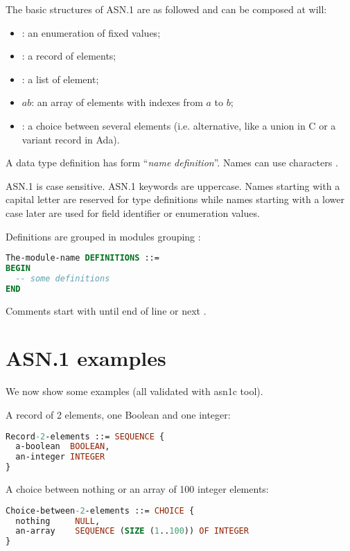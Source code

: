 The basic structures of ASN.1 are as followed and can be composed at
will:
\begin{itemize}
\item {}: an
  enumeration of fixed values;
\item {}: a record of
  elements;
\item {}: a list
  of element;
\item {}$a$$b$: an array of elements with indexes
  from $a$ to $b$;
\item {}: a choice between
  several elements (i.e. alternative, like a union in C or a variant
  record in Ada).
\end{itemize}

A data type definition has form ``\emph{name} \ASN{::=}
\emph{definition}''. Names can use characters .

ASN.1 is case sensitive. ASN.1 keywords are uppercase. Names starting
with a capital letter are reserved for type definitions while names
starting with a lower case later are used for field identifier or
enumeration values.

Definitions are grouped in modules grouping
:
\begin{lstlisting}[language=ASN1]
The-module-name DEFINITIONS ::=
BEGIN
  -- some definitions
END
\end{lstlisting}

Comments start with \ASN{--} until end of line or next \ASN{--}.

\section{ASN.1 examples}

We now show some examples (all validated with asn1c tool).

A record of 2 elements, one Boolean and one integer:
\begin{lstlisting}[language=ASN1]
Record-2-elements ::= SEQUENCE {
  a-boolean  BOOLEAN,
  an-integer INTEGER
}
\end{lstlisting}

A choice between nothing or an array of 100 integer elements:
\begin{lstlisting}[language=ASN1]
Choice-between-2-elements ::= CHOICE {
  nothing     NULL,
  an-array    SEQUENCE (SIZE (1..100)) OF INTEGER
}
\end{lstlisting}


